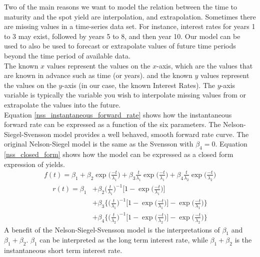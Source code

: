 \documentclass[11pt]{report}
\begin{document}
Two of the main reasons we want to model the relation between the time to maturity and the spot yield are interpolation, and extrapolation.
Sometimes there are missing values in a time-series data set. For instance, interest rates for years 1 to 3 may exist, followed by years 5 to 8, and then year 10. Our model can be used to also be used to forecast or extrapolate values of future time periods beyond the time period of available data.\\

The known $x$ values represent the values on the $x$-axis, which are the values that are known in advance such as time (or years). and the known $y$ values represent the values on the $y$-axis (in our case, the known Interest Rates). The $y$-axis variable is typically the variable you wish to interpolate missing values from or extrapolate the values into the future.\\

 Equation \eqref{nss_instantaneous_forward_rate} shows how the instantaneous forward rate can be expressed as a function of the six parameters. The Nelson-Siegel-Svensson model provides a well behaved, smooth forward rate curve. The original Nelson-Siegel model is the same as the Svensson with $\beta_4=0$. Equation \eqref{nss_closed_form} shows how the model can be expressed as a closed form expression of yields.
\begin{align}
	f(t)=\beta_1+\beta_2\exp\bigg(\frac{-t}{\lambda_1}\bigg)
			+\beta_3\frac{t}{\lambda_1}\exp\bigg(\frac{-t}{\lambda_1}\bigg)
			+\beta_4\frac{t}{\lambda_2}\exp\bigg(\frac{-t}{\lambda_2}\bigg)
			\label{nss_instantaneous_forward_rate}
\end{align}
\begin{align}
	r(t)=\beta_1&+\beta_2\bigg(\frac{t}{\lambda_1}\bigg)^{-1}\bigg[1-\exp\bigg(\frac{-t}{\lambda_1}\bigg)\bigg]\nonumber\\
		&+\beta_3\bigg\{\bigg(\frac{t}{\lambda_1}\bigg)^{-1}\bigg[1-\exp\bigg(\frac{-t}{\lambda_1}\bigg)\bigg]-\exp\bigg(\frac{-t}{\lambda_1}\bigg)\bigg\}\nonumber\\
		&+\beta_4\bigg\{\bigg(\frac{t}{\lambda_2}\bigg)^{-1}\bigg[1-\exp\bigg(\frac{-t}{\lambda_2}\bigg)\bigg]-\exp\bigg(\frac{-t}{\lambda_2}\bigg)\bigg\}
		\label{nss_closed_form}
\end{align}
A benefit of the Nelson-Siegel-Svensson model is the interpretations of $\beta_1$ and $\beta_1+\beta_2$. $\beta_1$ can be interpreted as the long term interest rate, while $\beta_1+\beta_2$ is the instantaneous short term interest rate.
\end{document}

